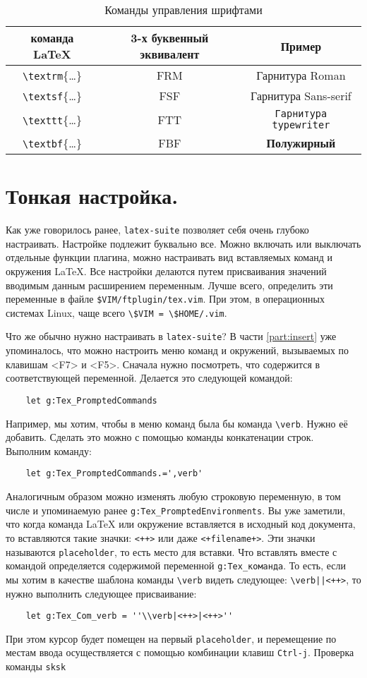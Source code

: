 \documentclass[a4paper]{article}
\begin{document}
			\begin{table}
				\centering
				\begin{tabular}{|c|c|c|}
					\hline
					команда \LaTeX&3-х буквенный эквивалент&Пример\\
					\hline
					\verb|\textrm|\{\ldots\}&FRM&\textrm{Гарнитура Roman}\\
					\verb|\textsf|\{\ldots\}&FSF&\textsf{Гарнитура Sans-serif}\\
					\verb|\texttt|\{\ldots\}&FTT&\texttt{Гарнитура typewriter}\\
					\verb|\textbf|\{\ldots\}&FBF&\textbf{Полужирный}\\
					\hline
				\end{tabular}
				\caption{Команды управления шрифтами}
				\label{tab:fonts}
			\end{table}
\part{Тонкая настройка.}
Как уже говорилось ранее, \texttt{latex-suite} позволяет себя очень глубоко настраивать.
Настройке подлежит буквально все. Можно включать или выключать отдельные функции плагина,
можно настраивать вид вставляемых команд и окружения \LaTeX. Все настройки делаются путем
присваивания значений вводимым данным расширением переменным. Лучше всего, определить эти
переменные в файле \verb|$VIM/ftplugin/tex.vim|. При этом, в операционных системах Linux, 
чаще всего \verb|\$VIM = \$HOME/.vim|.

Что же обычно нужно настраивать в \texttt{latex-suite}? В части \ref{part:insert} уже упоминалось, что 
можно настроить меню команд и окружений, вызываемых по клавишам <F7> и <F5>. Сначала нужно посмотреть,
что содержится в соответствующей переменной. Делается это следующей командой:
\begin{verbatim}
	let g:Tex_PromptedCommands
\end{verbatim}
Например, мы хотим, чтобы в меню команд была бы команда \verb|\verb|. Нужно её добавить. Сделать
это можно с помощью команды конкатенации строк. Выполним команду:
\begin{verbatim}
	let g:Tex_PromptedCommands.=',verb'
\end{verbatim}
Аналогичным образом можно изменять любую строковую переменную, в том числе и упоминаемую ранее
\verb|g:Tex_PromptedEnvironments|.
Вы уже заметили, что когда команда \LaTeX{} или окружение вставляется в исходный код документа, 
то вставляются такие значки: \verb|<++>| или даже \verb|<+filename+>|. Эти значки называются 
\texttt{placeholder}, то есть место для вставки. Что вставлять вместе с командой определяется 
содержимой переменной \verb|g:Tex_команда|. То есть, если мы хотим в качестве шаблона команды \verb|\verb| 
видеть следующее: \verb$\verb||<++>$, то нужно выполнить следующее присваивание:
\begin{verbatim}
	let g:Tex_Com_verb = ''\\verb|<++>|<++>''
\end{verbatim}
При этом курсор будет помещен на первый \texttt{placeholder}, и перемещение по местам ввода 
осуществляется с помощью комбинации клавиш \texttt{Ctrl-j}.
Проверка команды \verb|sksk|
\end{document}
